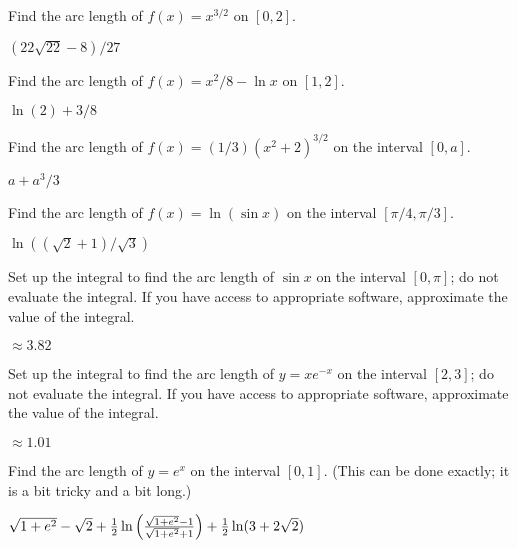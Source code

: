 \begin{exercises}

\begin{exercise} Find the arc length of $f(x)=x^{3/2}$ on $[0,2]$.
\begin{answer} $(22\sqrt{22}-8)/27$
\end{answer}\end{exercise}

\begin{exercise} Find the arc length of $f(x) = x^2/8-\ln x$
on $[1,2]$.
\begin{answer} $\ln(2)+3/8$
\end{answer}\end{exercise}

\begin{exercise}
Find the arc length of $f(x) = (1/3)(x^2 +2)^{3/2}$
on the interval $[0,a]$.
\begin{answer} $a+a^3/3$
\end{answer}\end{exercise}

\begin{exercise} Find the arc length of $f(x)=\ln(\sin x)$ on the
interval $[\pi/4,\pi/3]$.
\begin{answer} $\ln((\sqrt2+1)/\sqrt3)$
\end{answer}\end{exercise}


\begin{exercise} Set up the integral to find the arc length of $\sin x$ 
on the interval $[0,\pi]$; do not evaluate the integral. If you have
access to appropriate software, approximate the value of the integral.
\begin{answer} $\approx 3.82$
\end{answer}\end{exercise}

\begin{exercise} Set up the integral to find the arc length of $y=x e^{-x}$
on the interval $[2,3]$; do not evaluate the integral. If you have
access to appropriate software, approximate the value of the integral.
\begin{answer} $\approx 1.01$
\end{answer}\end{exercise}

\begin{exercise} Find the arc length of $y=e^x$ on the interval $[0,1]$.
(This can be done exactly; it is a bit tricky and a bit long.)
\begin{answer} $\sqrt{1+e^2}-\sqrt2+
{1\over2}\ln\left({\sqrt{1+e^2}-1\over\sqrt{1+e^2}+1}\right)+
{1\over2}\ln(3+2\sqrt2)$
\end{answer}\end{exercise}

\end{exercises}


